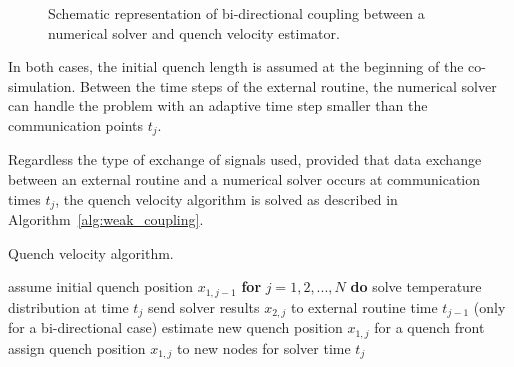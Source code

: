\begin{figure}[H]
\centering
{}
\caption{Schematic representation of bi-directional coupling between a numerical solver and quench velocity estimator.}
\label{fig:bidirectional_coupling_scheme}
\end{figure}

In both cases, the initial quench length is assumed at the beginning of the co-simulation. Between the time steps of the external routine, the numerical solver can handle the problem with an adaptive time step smaller than the communication points $t_j$.

Regardless the type of exchange of signals used, provided that data exchange between an external routine and a numerical solver occurs at communication times $t_j$, the quench velocity algorithm is solved as described in Algorithm~\ref{alg:weak_coupling}.

\begin{algorithm}[H]
  \caption{Quench velocity algorithm.}
  \label{alg:weak_coupling}
  \begin{algorithmic}[1]
    \STATE assume initial quench position $x_{1,j-1}$ 
    \STATE \textbf{for} $j=1,2,...,N$ \textbf{do}
    \STATE \hspace{0.5cm} solve temperature distribution at time $t_j$
    \STATE \hspace{0.5cm} send solver results $x_{2,j}$ to external routine time $t_{j-1}$ (only for a bi-directional case)
    \STATE \hspace{0.5cm} estimate new quench position $x_{1,j}$ for a quench front
    \STATE \hspace{0.5cm} assign quench position $x_{1,j}$ to new nodes for solver time  $t_j$
  \end{algorithmic}
\end{algorithm}


